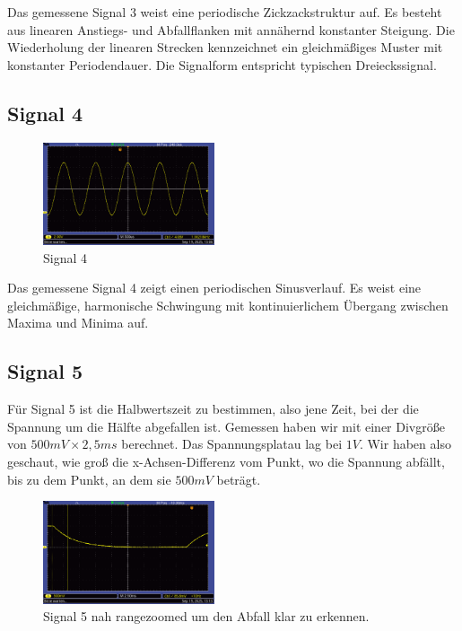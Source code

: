 Das gemessene Signal 3 weist eine periodische Zickzackstruktur auf. Es besteht aus linearen Anstiegs- und Abfallflanken mit annähernd konstanter Steigung. Die Wiederholung der linearen Strecken kennzeichnet ein gleichmäßiges Muster mit konstanter Periodendauer. Die Signalform entspricht typischen Dreieckssignal.

\subsection*{Signal 4}
\begin{figure} [h!]
    \centering
        \includegraphics[width=0.45\textwidth]{img/25/Signale2/Signal4.pdf}
    \caption{Signal 4}
\end{figure}

Das gemessene Signal 4 zeigt einen periodischen Sinusverlauf. Es weist eine gleichmäßige, harmonische Schwingung mit kontinuierlichem Übergang zwischen Maxima und Minima auf.

\newpage

\subsection*{Signal 5}

Für Signal 5 ist die Halbwertszeit zu bestimmen, also jene Zeit, bei der die Spannung um die Hälfte abgefallen ist.
Gemessen haben wir mit einer Divgröße von $500mV \times 2,5ms$ berechnet. Das Spannungsplatau lag bei $1V$. Wir haben also geschaut, wie groß die x-Achsen-Differenz vom Punkt, wo die Spannung abfällt, bis zu dem Punkt, an dem sie $500mV$ beträgt.

\begin{figure} [h!]
    \centering
        \includegraphics[width=0.45\textwidth]{img/25/Signale2/Signal5-Clean.pdf}
    \caption{Signal 5 nah rangezoomed um den Abfall klar zu erkennen.}
\end{figure}

